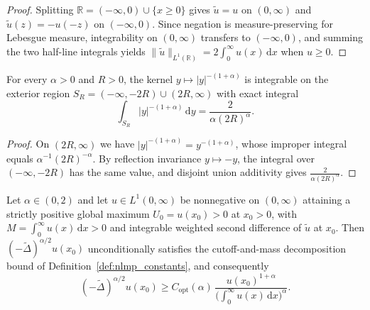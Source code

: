 \begin{proof}
\leanok
Splitting $\mathbb{R} = (-\infty, 0) \cup \{x \ge 0\}$ gives $\widetilde{u} = u$ on $(0, \infty)$ and $\widetilde{u}(z) = -u(-z)$ on $(-\infty, 0)$. Since negation is measure-preserving for Lebesgue measure, integrability on $(0, \infty)$ transfers to $(-\infty, 0)$, and summing the two half-line integrals yields $\lVert \widetilde{u} \rVert_{L^1(\mathbb{R})} = 2 \int_0^\infty u(x)\, \mathrm{d}x$ when $u \ge 0$.
\end{proof}

\begin{lemma}\label{lem:exterior_rpow_tail}
\leanok
For every $\alpha > 0$ and $R > 0$, the kernel $y \mapsto \lvert y \rvert^{-(1 + \alpha)}$ is integrable on the exterior region $S_R = (-\infty, -2R) \cup (2R, \infty)$ with exact integral
\[
  \int_{S_R} \lvert y \rvert^{-(1 + \alpha)}\, \mathrm{d}y = \frac{2}{\alpha (2R)^\alpha}.
\]
\end{lemma}

\begin{proof}
\leanok
On $(2R, \infty)$ we have $\lvert y \rvert^{-(1 + \alpha)} = y^{-(1 + \alpha)}$, whose improper integral equals $\alpha^{-1}(2R)^{-\alpha}$. By reflection invariance $y \mapsto -y$, the integral over $(-\infty, -2R)$ has the same value, and disjoint union additivity gives $\frac{2}{\alpha (2R)^\alpha}$.
\end{proof}

\begin{theorem}\label{thm:unconditional_nlmp_cutoff_bound}
\leanok
Let $\alpha \in (0, 2)$ and let $u \in L^1(0, \infty)$ be nonnegative on $(0, \infty)$ attaining a strictly positive global maximum $U_0 = u(x_0) > 0$ at $x_0 > 0$, with $M = \int_0^\infty u(x)\, \mathrm{d}x > 0$ and integrable weighted second difference of $\widetilde{u}$ at $x_0$. Then $(-\widetilde{\Delta})^{\alpha/2} u(x_0)$ unconditionally satisfies the cutoff-and-mass decomposition bound of Definition~\ref{def:nlmp_constants}, and consequently
\[
  (-\widetilde{\Delta})^{\alpha/2} u(x_0) \ge C_{\mathrm{opt}}(\alpha)\, \frac{u(x_0)^{1 + \alpha}}{\bigl(\int_0^\infty u(x)\, \mathrm{d}x\bigr)^\alpha}.
\]
\end{theorem}

